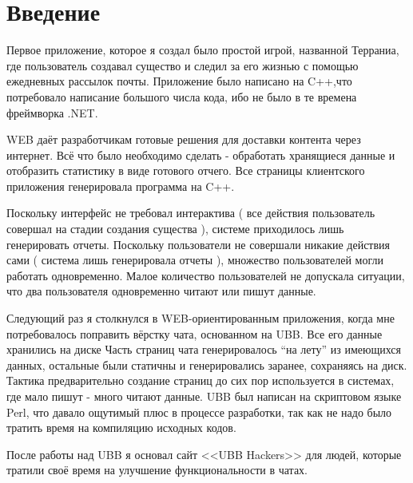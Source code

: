 \chapter*{Введение}							%




Первое приложение, которое я создал было простой игрой, названной Терраниа, где пользователь создавал существо и следил за его жизнью с помощью ежедневных рассылок почты. Приложение было написано на C++,что потребовало написание большого числа кода, ибо не было в те времена фреймворка .NET.

WEB  даёт разработчикам готовые решения для доставки контента через интернет. Всё что было необходимо сделать - обработать хранящиеся данные и отобразить статистику в виде готового отчего. Все страницы клиентского приложения генерировала программа на C++.

Поскольку интерфейс не требовал интерактива ( все действия пользователь совершал на стадии создания существа ),  системе приходилось лишь генерировать отчеты. Поскольку пользователи не совершали никакие действия сами ( система лишь генерировала отчеты ), множество пользователей могли работать одновременно. Малое количество пользователей не допускала ситуации, что два пользователя одновременно читают или пишут данные.


Следующий раз я столкнулся в WEB-ориентированным приложения, когда мне потребовалось поправить вёрстку чата, основанном на  UBB. Все его данные хранились на диске Часть страниц чата генерировалось ``на лету'' из имеющихся данных, остальные были статичны и генерировались заранее, сохраняясь на диск. Тактика предварительно создание страниц до сих пор используется в системах, где мало пишут - много читают данные. UBB был написан на скриптовом языке Perl, что давало ощутимый плюс в процессе разработки, так как не надо было тратить время на компиляцию исходных кодов.

После работы над UBB я основал сайт <<UBB Hackers>> для людей, которые тратили своё время на улучшение функциональности в чатах. 


